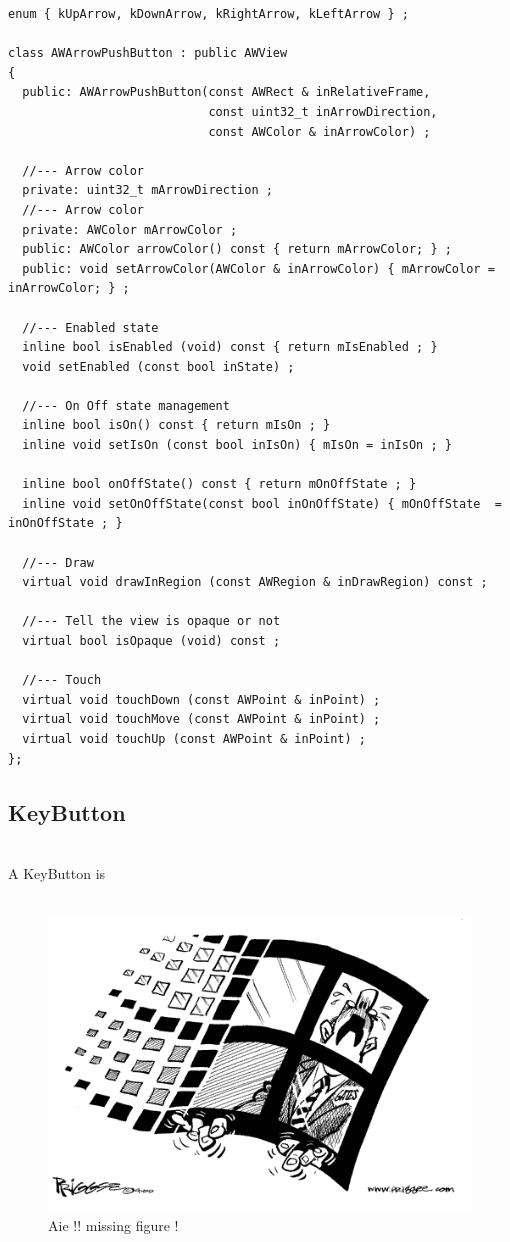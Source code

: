 \documentclass[a4paper,11pt]{extarticle}
\begin{document}
\begin{lstlisting}[language=Arduinonl]
enum { kUpArrow, kDownArrow, kRightArrow, kLeftArrow } ;

class AWArrowPushButton : public AWView
{
  public: AWArrowPushButton(const AWRect & inRelativeFrame,
                            const uint32_t inArrowDirection,
                            const AWColor & inArrowColor) ;

  //--- Arrow color
  private: uint32_t mArrowDirection ;
  //--- Arrow color
  private: AWColor mArrowColor ;
  public: AWColor arrowColor() const { return mArrowColor; } ;
  public: void setArrowColor(AWColor & inArrowColor) { mArrowColor = inArrowColor; } ;

  //--- Enabled state
  inline bool isEnabled (void) const { return mIsEnabled ; }
  void setEnabled (const bool inState) ;

  //--- On Off state management
  inline bool isOn() const { return mIsOn ; }
  inline void setIsOn (const bool inIsOn) { mIsOn = inIsOn ; }

  inline bool onOffState() const { return mOnOffState ; }
  inline void setOnOffState(const bool inOnOffState) { mOnOffState  = inOnOffState ; }

  //--- Draw
  virtual void drawInRegion (const AWRegion & inDrawRegion) const ;

  //--- Tell the view is opaque or not
  virtual bool isOpaque (void) const ;

  //--- Touch
  virtual void touchDown (const AWPoint & inPoint) ;
  virtual void touchMove (const AWPoint & inPoint) ;
  virtual void touchUp (const AWPoint & inPoint) ;
};
\end{lstlisting}


\newpage
\subsection{KeyButton}

~\\ A KeyButton is 
~\\
~\\

\begin{figure}[htbp]
   \centering
   \includegraphics[scale=0.55]{AWFig.png} 
   \caption{Aie !! missing figure !}
   \label{fig:17}
\end{figure}
\end{document}

